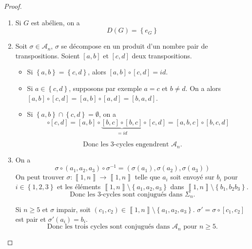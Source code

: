 \documentclass[12pt]{article}
\begin{document}
\begin{proof}
	\phantom{}
	\begin{enumerate}
		\item Si $G$ est abélien, on a 
		\begin{equation}
			\boxed{D(G)=\left\{e_{G}\right\}}
		\end{equation}
		\item Soit $\sigma\in\mathcal{A}_{n}$, $\sigma$ se décompose en un produit d'un nombre pair de transpositions. Soient $[a,b]$ et $[c,d]$ deux transpositions.
		\begin{itemize}
			\item Si $\left\{a,b\right\}=\left\{c,d\right\}$, alors $[a,b]\circ[c,d]=id$.
			\item Si $a\in\left\{c,d\right\}$, supposons par exemple $a=c$ et $b\neq d$. On a alors $[a,b]\circ[c,d]=[a,b]\circ[a,d]=[b,a,d]$.
			\item Si $\left\{a,b\right\}\cap\left\{c,d\right\}=\emptyset$, on a 
			\begin{equation}
				[a,b]\circ[c,d]=[a,b]\circ\underbrace{[b,c]\circ[b,c]}_{=id}\circ[c,d]=[a,b,c]\circ[b,c,d]
			\end{equation}
		\end{itemize}
		\begin{equation}
			\boxed{\text{Donc les 3-cycles engendrent }\mathcal{A}_{n}.}
		\end{equation}

		\item On a 
		\begin{equation}
			\sigma\circ(a_{1},a_{2},a_{3})\circ\sigma^{-1}=(\sigma(a_{1}),\sigma(a_{2}),\sigma(a_{3}))
		\end{equation}
		On peut trouver $\sigma\colon\left\llbracket 1,n\right\rrbracket \to\left\llbracket 1,n\right\rrbracket$ telle que $a_{i}$ soit envoyé sur $b_{i}$ pour $i\in\left\{1,2,3\right\}$ et les éléments $\left\llbracket 1,n\right\rrbracket \setminus\left\{a_{1},a_{2},a_{3}\right\}$ dans $\left\llbracket 1,n\right\rrbracket\setminus\left\{b_{1},b_{2}b_{3}\right\}$.
		\begin{equation}
			\boxed{\text{Donc les 3-cycles sont conjugués dans }\Sigma_{n}.}
		\end{equation}

		Si $n\geqslant5$ et $\sigma$ impair, soit $(c_{1},c_{2})\in\left\llbracket 1,n\right\rrbracket\setminus\left\{a_{1},a_{2},a_{3}\right\}$. $\sigma'=\sigma\circ[c_{1},c_{2}]$ est pair et $\sigma'(a_{i})=b_{i}$. 
		\begin{equation}
			\boxed{\text{Donc les trois cycles sont conjugués dans }\mathcal{A}_{n}\text{ pour }n\geqslant5.}
		\end{equation}
		

\end{enumerate}
\end{proof}
\end{document}
